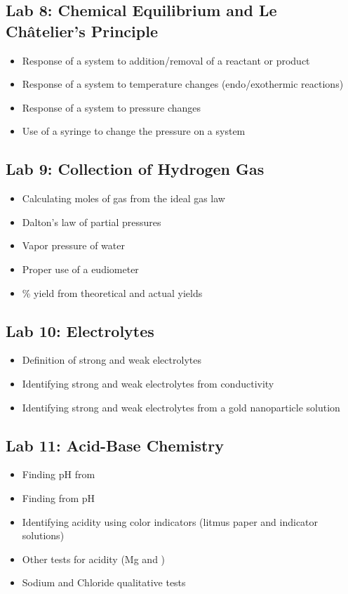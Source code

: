 \documentclass[12pt, letterpaper]{memoir}
\begin{document}
	\subsection*{Lab 8: Chemical Equilibrium and Le Ch\^atelier's Principle}
	\begin{itemize}
		\item Response of a system to addition/removal of a reactant or product
		\item Response of a system to temperature changes (endo/exothermic reactions)
		\item Response of a system to pressure changes
		\item Use of a syringe to change the pressure on a system
	\end{itemize}
	
	\subsection*{Lab 9: Collection of Hydrogen Gas}
	\begin{itemize}
		\item Calculating moles of gas from the ideal gas law
		\item Dalton's law of partial pressures
		\item Vapor pressure of water
		\item Proper use of a eudiometer
		\item \% yield from theoretical and actual yields
	\end{itemize}
	
	\subsection*{Lab 10: Electrolytes}
	\begin{itemize}
		\item Definition of strong and weak electrolytes
		\item Identifying strong and weak electrolytes from conductivity
		\item Identifying strong and weak electrolytes from a gold nanoparticle solution
	\end{itemize}
	
	\subsection*{Lab 11: Acid-Base Chemistry}
	\begin{itemize}
		\item Finding pH from \ch{[H3O^+]}
		\item Finding \ch{[H3O^+]} from pH
		\item Identifying acidity using color indicators (litmus paper and indicator solutions)
		\item Other tests for acidity (Mg and )
		\item Sodium and Chloride qualitative tests
	\end{itemize}
\end{document}
